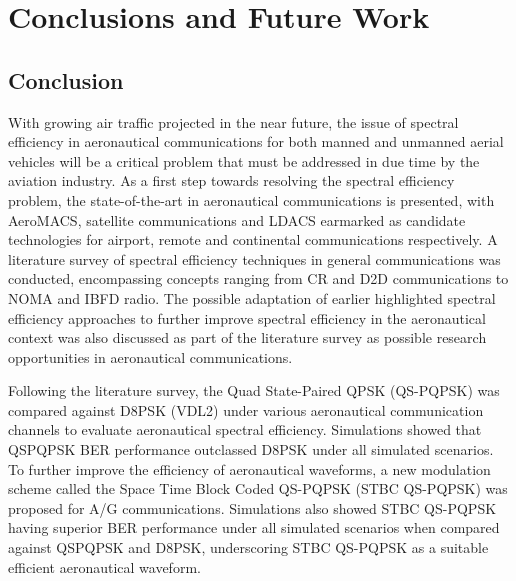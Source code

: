 \chapter{Conclusions and Future Work}
\section{Conclusion}
With growing air traffic projected in the near future, the issue of spectral efficiency in aeronautical communications for both manned and unmanned aerial vehicles will be a critical problem that must be addressed in due time by the aviation industry. As a first step towards resolving the spectral efficiency problem, the state-of-the-art in aeronautical communications is presented, with AeroMACS, satellite communications and LDACS earmarked as candidate technologies for airport, remote and continental communications respectively. A literature survey of spectral efficiency techniques in general communications was conducted, encompassing concepts ranging from CR and D2D communications to NOMA and IBFD radio. The possible adaptation of earlier highlighted spectral efficiency approaches to further improve spectral efficiency in the aeronautical context was also discussed as part of the literature survey as possible research opportunities in aeronautical communications.

Following the literature survey, the Quad State-Paired QPSK (QS-PQPSK) was compared against D8PSK (VDL2) under various aeronautical communication channels to evaluate aeronautical spectral efficiency. Simulations showed that QSPQPSK BER performance outclassed D8PSK under all simulated scenarios. To further improve the efficiency of aeronautical waveforms, a new modulation scheme called the Space Time Block Coded QS-PQPSK (STBC QS-PQPSK) was proposed for A/G communications. Simulations also showed STBC QS-PQPSK having superior BER performance under all simulated scenarios when compared against QSPQPSK and D8PSK, underscoring STBC QS-PQPSK as a suitable efficient aeronautical waveform. 

